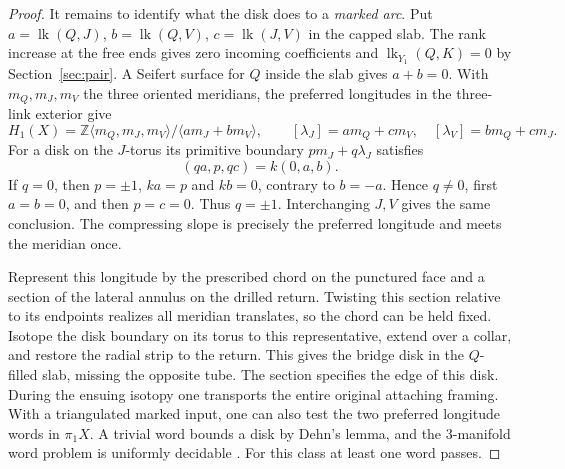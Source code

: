 \documentclass[11pt,letterpaper]{article}
\numberwithin{equation}{section}
\theoremstyle{remark}
\begin{document}
\begin{proof}
It remains to identify what the disk does to a \emph{marked arc}.
Put \(a=\operatorname{lk}(Q,J)\), \(b=\operatorname{lk}(Q,V)\),
\(c=\operatorname{lk}(J,V)\) in the capped slab. The rank increase
at the free ends gives zero incoming coefficients and
\(\operatorname{lk}_{Y_1}(Q,K)=0\) by Section~\ref{sec:pair}.
A Seifert surface for \(Q\) inside the slab gives \(a+b=0\).
With \(m_Q,m_J,m_V\) the three oriented meridians, the preferred
longitudes in the three-link exterior give
\[
 H_1(X)=\mathbb Z\langle m_Q,m_J,m_V\rangle/
               \langle a m_J+b m_V\rangle,\qquad
 [\lambda_J]=a m_Q+c m_V,\quad [\lambda_V]=b m_Q+c m_J .
\]
For a disk on the \(J\)-torus its primitive boundary
\(p m_J+q\lambda_J\) satisfies
\[
 (qa,p,qc)=k(0,a,b).
\]
If \(q=0\), then \(p=\pm1\), \(ka=p\) and \(kb=0\), contrary to
\(b=-a\). Hence \(q\ne0\), first \(a=b=0\), and then \(p=c=0\).
Thus \(q=\pm1\). Interchanging \(J,V\) gives the same conclusion.
The compressing slope is precisely the preferred longitude and
meets the meridian once.

Represent this longitude by the prescribed chord on the punctured
face and a section of the lateral annulus on the drilled return.
Twisting this section relative to its endpoints realizes all
meridian translates, so the chord can be held fixed. Isotope the
disk boundary on its torus to this representative, extend over a
collar, and restore the radial strip to the return. This gives the
bridge disk in the \(Q\)-filled slab, missing the opposite tube.
The section specifies the edge of this disk. During the ensuing
isotopy one transports the entire original attaching framing.
With a triangulated marked input, one can also test the two
preferred longitude words in \(\pi_1 X\). A trivial word bounds a
disk by Dehn's lemma, and the 3-manifold word problem is uniformly
decidable \cite{Papakyriakopoulos1957Dehn,AschenbrennerFriedlWilton2015Decision}.
For this class at least one word passes.


\end{proof}
\end{document}
